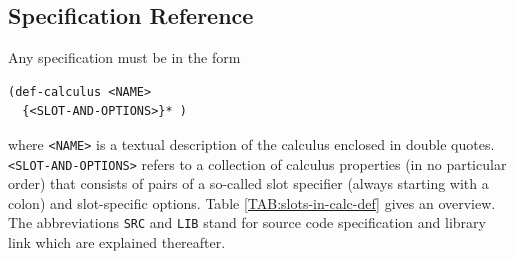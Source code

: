 \documentclass[headsepline]{scrreprt}
\theoremstyle{definition}
\begin{document}
\subsection{Specification Reference}

Any specification must be in the form

\begin{verbatim}
(def-calculus <NAME>
  {<SLOT-AND-OPTIONS>}* )
\end{verbatim}
where \verb=<NAME>= is a textual description of the calculus enclosed in double quotes. \linebreak[4]
\verb=<SLOT-AND-OPTIONS>= refers to a collection of calculus properties (in no particular order) that consists of pairs of a so-called slot specifier (always starting with a colon) and slot-specific options. Table \ref{TAB:slots-in-calc-def} gives an overview. The abbreviations {\tt SRC} and {\tt LIB} stand for source code specification and library link which are explained thereafter.
\end{document}
